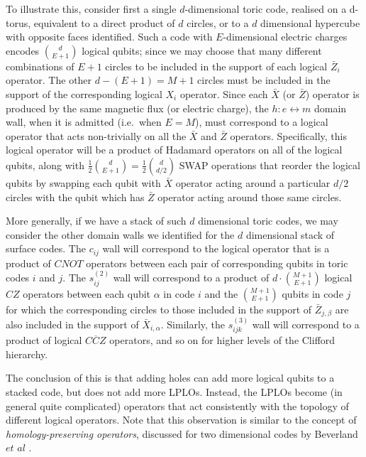 \documentclass[pra,twocolumn,a4paper,nofootinbib]{revtex4-1}
\begin{document}
To illustrate this, consider first a single $d$-dimensional toric code, realised on a d-torus, equivalent to a direct product of $d$ circles, or to a $d$ dimensional hypercube with opposite faces identified. Such a code with $E$-dimensional electric charges encodes ${d}\choose{E+1}$ logical qubits; since we may choose that many different combinations of $E+1$ circles to be included in the support of each logical $\bar{Z}_i$ operator. The other $d-(E+1)=M+1$ circles must be included in the support of the corresponding logical $X_i$ operator. Since each $\bar{X}$ (or $\bar{Z}$) operator is produced by the same magnetic flux (or electric charge), the $h: e \leftrightarrow m$ domain wall, when it is admitted (i.e.~when $E=M$), must correspond to a logical operator that acts non-trivially on all the $\bar{X}$ and $\bar{Z}$ operators. Specifically, this logical operator will be a product of Hadamard operators on all of the logical qubits, along with $\frac{1}{2}{{d}\choose{E+1}}=\frac{1}{2} {{d}\choose{d/2}}$  SWAP operations that reorder the logical qubits by swapping each qubit with $\bar{X}$ operator acting around a particular $d/2$ circles with the qubit which has $\bar{Z}$ operator acting around those same circles.

More generally, if we have a stack of such $d$ dimensional toric codes, we may consider the other domain walls we identified for the $d$ dimensional stack of surface codes. The $c_{ij}$ wall will correspond to the logical operator that is a product of $CNOT$ operators between each pair of corresponding qubits in toric codes $i$ and $j$. The $s_{ij}^{(2)}$ wall will correspond to a product of $d\cdot {{M+1}\choose {E+1}}$ logical $CZ$ operators between each qubit $\alpha$ in code $i$ and the ${M+1}\choose {E+1}$ qubits in code $j$ for which the corresponding circles to those included in the support of $\bar{Z}_{j,\beta}$ are also included in the support of $\bar{X}_{i,\alpha}$. Similarly, the $s_{ijk}^{(3)}$ wall will correspond to a product of logical $\overline{CCZ}$ operators, and so on for higher levels of the Clifford hierarchy.

The conclusion of this is that adding holes can add more logical qubits to a stacked code, but does not add more LPLOs. Instead, the LPLOs become (in general quite complicated) operators that act consistently with the topology of different logical operators. Note that this observation is similar to the concept of \textit{homology-preserving operators}, discussed for two dimensional codes by Beverland $\textit{et al}$ \cite{Beverland}.
\end{document}
